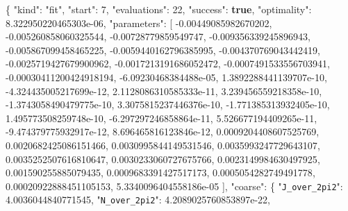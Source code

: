 \documentclass[
  10pt,
]{article}
\newenvironment{Shaded}{}{}
\newcommand{\DataTypeTok}[1]{\textcolor[rgb]{0.56,0.13,0.00}{#1}}
\newcommand{\DecValTok}[1]{\textcolor[rgb]{0.25,0.63,0.44}{#1}}
\newcommand{\FloatTok}[1]{\textcolor[rgb]{0.25,0.63,0.44}{#1}}
\newcommand{\FunctionTok}[1]{\textcolor[rgb]{0.02,0.16,0.49}{#1}}
\newcommand{\KeywordTok}[1]{\textcolor[rgb]{0.00,0.44,0.13}{\textbf{#1}}}
\newcommand{\OtherTok}[1]{\textcolor[rgb]{0.00,0.44,0.13}{#1}}
\newcommand{\StringTok}[1]{\textcolor[rgb]{0.25,0.44,0.63}{#1}}
\begin{document}
\begin{Shaded}
\begin{Highlighting}[]
\FunctionTok{\{}
  \DataTypeTok{"kind"}\FunctionTok{:} \StringTok{"fit"}\FunctionTok{,}
  \DataTypeTok{"start"}\FunctionTok{:} \DecValTok{7}\FunctionTok{,}
  \DataTypeTok{"evaluations"}\FunctionTok{:} \DecValTok{22}\FunctionTok{,}
  \DataTypeTok{"success"}\FunctionTok{:} \KeywordTok{true}\FunctionTok{,}
  \DataTypeTok{"optimality"}\FunctionTok{:} \FloatTok{8.322950220465303e{-}06}\FunctionTok{,}
  \DataTypeTok{"parameters"}\FunctionTok{:} \OtherTok{[}
    \FloatTok{{-}0.00449085982670202}\OtherTok{,}
    \FloatTok{{-}0.005260858060325544}\OtherTok{,}
    \FloatTok{{-}0.00728779859549747}\OtherTok{,}
    \FloatTok{{-}0.009356339245896943}\OtherTok{,}
    \FloatTok{{-}0.005867099458465225}\OtherTok{,}
    \FloatTok{{-}0.0059440162796385995}\OtherTok{,}
    \FloatTok{{-}0.004370769043442419}\OtherTok{,}
    \FloatTok{{-}0.0025719427679900962}\OtherTok{,}
    \FloatTok{{-}0.0017213191686052472}\OtherTok{,}
    \FloatTok{{-}0.0007491533556703941}\OtherTok{,}
    \FloatTok{{-}0.00030411200424918194}\OtherTok{,}
    \FloatTok{{-}6.09230468384488e{-}05}\OtherTok{,}
    \FloatTok{1.3892288441139707e{-}10}\OtherTok{,}
    \FloatTok{{-}4.324435005217699e{-}12}\OtherTok{,}
    \FloatTok{2.1128086310585333e{-}11}\OtherTok{,}
    \FloatTok{3.239456559218358e{-}10}\OtherTok{,}
    \FloatTok{{-}1.3743058490479775e{-}10}\OtherTok{,}
    \FloatTok{3.3075815237446376e{-}10}\OtherTok{,}
    \FloatTok{{-}1.771385313932405e{-}10}\OtherTok{,}
    \FloatTok{1.495773508259748e{-}10}\OtherTok{,}
    \FloatTok{{-}6.297297246858864e{-}11}\OtherTok{,}
    \FloatTok{5.526677194409265e{-}11}\OtherTok{,}
    \FloatTok{{-}9.474379775932917e{-}12}\OtherTok{,}
    \FloatTok{8.696465816123846e{-}12}\OtherTok{,}
    \FloatTok{0.0009204408607525769}\OtherTok{,}
    \FloatTok{0.0020682425086151466}\OtherTok{,}
    \FloatTok{0.0030995844149531546}\OtherTok{,}
    \FloatTok{0.0035993247729643107}\OtherTok{,}
    \FloatTok{0.0035252507616810647}\OtherTok{,}
    \FloatTok{0.0030233060727675766}\OtherTok{,}
    \FloatTok{0.0023149984630497925}\OtherTok{,}
    \FloatTok{0.001590255885079435}\OtherTok{,}
    \FloatTok{0.0009683391427517173}\OtherTok{,}
    \FloatTok{0.0005054282749491778}\OtherTok{,}
    \FloatTok{0.00020922888451105153}\OtherTok{,}
    \FloatTok{5.3340096404558186e{-}05}
  \OtherTok{]}\FunctionTok{,}
  \DataTypeTok{"coarse"}\FunctionTok{:} \FunctionTok{\{}
    \DataTypeTok{"\nolinkurl{J_over_2pi2}"}\FunctionTok{:} \FloatTok{4.0036044840771545}\FunctionTok{,}
    \DataTypeTok{"\nolinkurl{N_over_2pi2}"}\FunctionTok{:} \FloatTok{4.2089025760853897e{-}22}\FunctionTok{,}

\end{Highlighting}
\end{Shaded}
\end{document}
